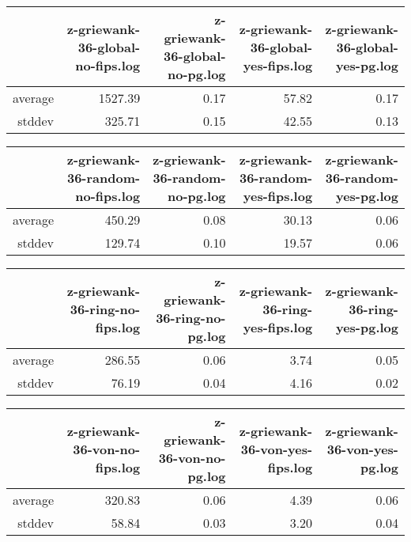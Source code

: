 \begin{table}[ht]
\centering
\begin{tabular}{rrrrr}
  \hline
 & z-griewank-36-global-no-fips.log & z-griewank-36-global-no-pg.log & z-griewank-36-global-yes-fips.log & z-griewank-36-global-yes-pg.log \\ 
  \hline
average & 1527.39 & 0.17 & 57.82 & 0.17 \\ 
  stddev & 325.71 & 0.15 & 42.55 & 0.13 \\ 
   \hline
\end{tabular}
\end{table}
\begin{table}[ht]
\centering
\begin{tabular}{rrrrr}
  \hline
 & z-griewank-36-random-no-fips.log & z-griewank-36-random-no-pg.log & z-griewank-36-random-yes-fips.log & z-griewank-36-random-yes-pg.log \\ 
  \hline
average & 450.29 & 0.08 & 30.13 & 0.06 \\ 
  stddev & 129.74 & 0.10 & 19.57 & 0.06 \\ 
   \hline
\end{tabular}
\end{table}
\begin{table}[ht]
\centering
\begin{tabular}{rrrrr}
  \hline
 & z-griewank-36-ring-no-fips.log & z-griewank-36-ring-no-pg.log & z-griewank-36-ring-yes-fips.log & z-griewank-36-ring-yes-pg.log \\ 
  \hline
average & 286.55 & 0.06 & 3.74 & 0.05 \\ 
  stddev & 76.19 & 0.04 & 4.16 & 0.02 \\ 
   \hline
\end{tabular}
\end{table}
\begin{table}[ht]
\centering
\begin{tabular}{rrrrr}
  \hline
 & z-griewank-36-von-no-fips.log & z-griewank-36-von-no-pg.log & z-griewank-36-von-yes-fips.log & z-griewank-36-von-yes-pg.log \\ 
  \hline
average & 320.83 & 0.06 & 4.39 & 0.06 \\ 
  stddev & 58.84 & 0.03 & 3.20 & 0.04 \\ 
   \hline
\end{tabular}
\end{table}
